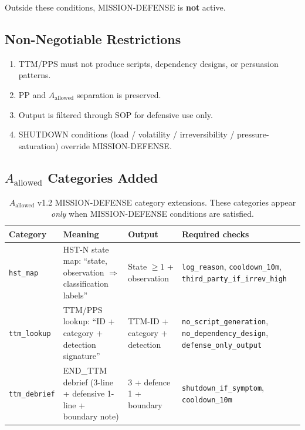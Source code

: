 \noindent
Outside these conditions, MISSION-DEFENSE is \textbf{not} active.

\subsection{Non-Negotiable Restrictions}
\label{sec:a-allowed-mdef-restrictions}

\begin{enumerate}
\item TTM/PPS must not produce scripts, dependency designs, or
persuasion patterns.
\item PP and $A_{\mathrm{allowed}}$ separation is preserved.
\item Output is filtered through SOP for defensive use only.
\item SHUTDOWN conditions (load / volatility / irreversibility /
pressure-saturation) override MISSION-DEFENSE.
\end{enumerate}

\subsection{$A_{\mathrm{allowed}}$ Categories Added}
\label{sec:a-allowed-mdef-categories}

\begin{table}[ht]
\centering
\small
\begin{tabularx}{\linewidth}{lXXX}
\toprule
\textbf{Category} & \textbf{Meaning} & \textbf{Output} & \textbf{Required checks} \\
\midrule

\texttt{hst\_map}
& HST-N state map: ``state, observation $\Rightarrow$ classification
labels''
& State $\ge 1$ + observation
& \texttt{log\_reason}, \texttt{cooldown\_10m},
\texttt{third\_party\_if\_irrev\_high} \\

\texttt{ttm\_lookup}
& TTM/PPS lookup: ``ID + category + detection signature''
& TTM-ID + category + detection
& \texttt{no\_script\_generation},
\texttt{no\_dependency\_design},
\texttt{defense\_only\_output} \\

\texttt{ttm\_debrief}
& END\_TTM debrief (3-line + defensive 1-line + boundary note)
& 3 + defence 1 + boundary
& \texttt{shutdown\_if\_symptom},
\texttt{cooldown\_10m} \\

\bottomrule
\end{tabularx}
\caption[MISSION-DEFENSE category extensions]{$A_{\mathrm{allowed}}$
v1.2 MISSION-DEFENSE category extensions. These categories appear
\emph{only} when MISSION-DEFENSE conditions are satisfied.}
\label{tab:a-allowed-mdef-categories}
\end{table}

